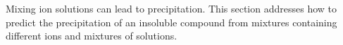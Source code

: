 \documentclass[main.tex]{subfiles}
\begin{document}
\section{\color{blue!30!black}{Predicting precipitation from mixtures and solutions}}
Mixing ion solutions can lead to precipitation. This section addresses how to predict the precipitation of an insoluble compound from mixtures containing different ions and mixtures of solutions. 
\sloppy
\end{document}
